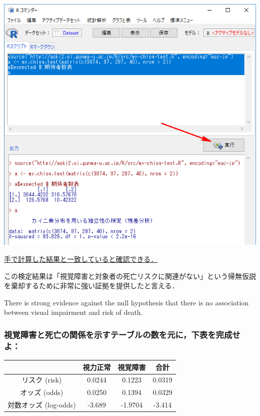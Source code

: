 \documentclass[]{problemset}
\begin{document}
\begin{center}\includegraphics[width=0.8\linewidth]{pic/mychisqtest01} \end{center}

\underline{手で計算した結果と一致していると確認できる．}

この検定結果は「視覚障害と対象者の死亡リスクに関連がない」という帰無仮説を棄却するために非常に強い証拠を提供したと言える．

There is strong evidence against the null hypothesis that there is no
association between visual impairment and risk of death.

\newpage
\vfill

\subsubsection{視覚障害と死亡の関係を示すテーブルの数を元に，下表を完成せよ：}

\begin{center}
\begin{tabular}{|c|c|c|c|}
\hline
                 & 視力正常   & 視覚障害    & 合計   \\ \hline
リスク (risk)       & 0.0244 & 0.1223  & 0.0319 \\ \hline
オッズ (odds)       & 0.0250 & 0.1394  & 0.0329 \\ \hline
対数オッズ (log-odds) & -3.689 & -1.9704 & -3.414 \\ \hline
\end{tabular}
\end{center}

\bigskip
\end{document}
